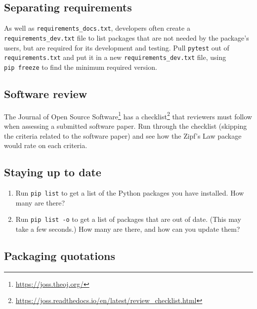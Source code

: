 \documentclass[
]{krantz}
\renewcommand{\href}[2]{#2\footnote{\url{#1}}}
\begin{document}
\hypertarget{packaging-ex-separating-requirements}{%
\subsection{Separating requirements}\label{packaging-ex-separating-requirements}}

As well as \texttt{requirements\_docs.txt},
developers often create a \texttt{requirements\_dev.txt} file
to list packages that are not needed by the package's users,
but are required for its development and testing.
Pull \texttt{pytest} out of \texttt{requirements.txt} and put it in a new \texttt{requirements\_dev.txt} file,
using \texttt{pip\ freeze} to find the minimum required version.

\hypertarget{packaging-ex-software-review}{%
\subsection{Software review}\label{packaging-ex-software-review}}

The \href{https://joss.theoj.org/}{Journal of Open Source Software} has a \href{https://joss.readthedocs.io/en/latest/review_checklist.html}{checklist}
that reviewers must follow when assessing a submitted software paper.
Run through the checklist (skipping the criteria related to the software paper)
and see how the Zipf's Law package would rate on each criteria.

\hypertarget{packaging-ex-up-to-date}{%
\subsection{Staying up to date}\label{packaging-ex-up-to-date}}

\begin{enumerate}
\def\labelenumi{\arabic{enumi}.}
\item
  Run \texttt{pip\ list} to get a list of the Python packages you have installed.
  How many are there?
\item
  Run \texttt{pip\ list\ -o} to get a list of packages that are out of date.
  (This may take a few seconds.)
  How many are there,
  and how can you update them?
\end{enumerate}

\hypertarget{packaging-ex-pratchett}{%
\subsection{Packaging quotations}\label{packaging-ex-pratchett}}
\end{document}
